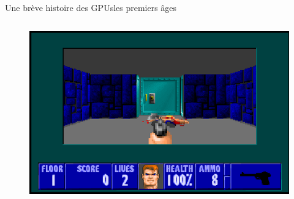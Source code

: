 \documentclass[11pt,mathserif]{beamer}
\begin{document}
\begin{frame}{Une brève histoire des GPUs}{les premiers âges}
\begin{columns}[t]
\begin{figure}[htbp]
  \includegraphics[width=0.8\linewidth]{fig/wolf2.png}
    \end{figure}
  \end{columns}
\end{frame}
\end{document}
